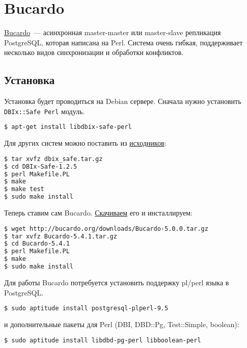 \section{Bucardo}

\href{https://bucardo.org/wiki/Bucardo}{Bucardo}~--- асинхронная master-master или master-slave репликация PostgreSQL, которая написана на Perl. Система очень гибкая, поддерживает несколько видов синхронизации и обработки конфликтов.

\subsection{Установка}

Установка будет проводиться на Debian сервере. Сначала нужно установить \lstinline!DBIx::Safe Perl! модуль.

\begin{lstlisting}[language=Bash,label=lst:bucardo1,caption=Установка]
$ apt-get install libdbix-safe-perl
\end{lstlisting}

Для других систем можно поставить из \href{http://search.cpan.org/CPAN/authors/id/T/TU/TURNSTEP/}{исходников}:

\begin{lstlisting}[language=Bash,label=lst:bucardo2,caption=Установка]
$ tar xvfz dbix_safe.tar.gz
$ cd DBIx-Safe-1.2.5
$ perl Makefile.PL
$ make
$ make test
$ sudo make install
\end{lstlisting}

Теперь ставим сам Bucardo. \href{http://bucardo.org/wiki/Bucardo#Obtaining_Bucardo}{Скачиваем} его и инсталлируем:

\begin{lstlisting}[language=Bash,label=lst:bucardo3,caption=Установка]
$ wget http://bucardo.org/downloads/Bucardo-5.0.0.tar.gz
$ tar xvfz Bucardo-5.4.1.tar.gz
$ cd Bucardo-5.4.1
$ perl Makefile.PL
$ make
$ sudo make install
\end{lstlisting}

Для работы Bucardo потребуется установить поддержку pl/perl языка в PostgreSQL.

\begin{lstlisting}[language=Bash,label=lst:bucardo4,caption=Установка]
$ sudo aptitude install postgresql-plperl-9.5
\end{lstlisting}

и дополнительные пакеты для Perl (DBI, DBD::Pg, Test::Simple, boolean):

\begin{lstlisting}[language=Bash,label=lst:bucardo-packet1,caption=Установка]
$ sudo aptitude install libdbd-pg-perl libboolean-perl
\end{lstlisting}

